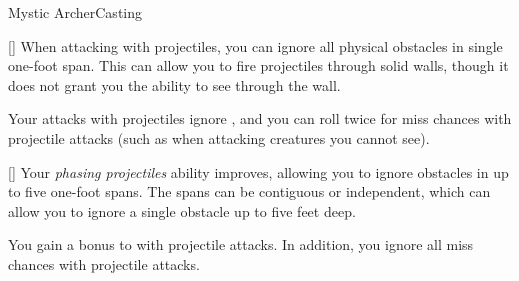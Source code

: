 \begin{feat}{Mystic Archer}{Casting}

        [] When attacking with projectiles, you can ignore all physical obstacles in single one-foot span.
        This can allow you to fire projectiles through solid walls, though it does not grant you the ability to see through the wall.

         Your attacks with projectiles ignore , and you can roll twice for miss chances with projectile attacks (such as when attacking creatures you cannot see).

        [] Your \textit{phasing projectiles} ability improves, allowing you to ignore obstacles in up to five one-foot spans.
        The spans can be contiguous or independent, which can allow you to ignore a single obstacle up to five feet deep.

         You gain a  bonus to  with projectile attacks.
        In addition, you ignore all miss chances with projectile attacks.
    \end{feat}

